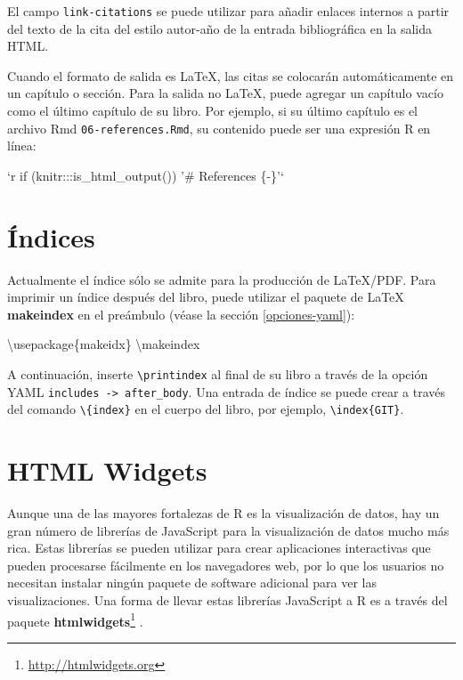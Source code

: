 \documentclass[12pt,]{krantz}
\makeatletter
\newenvironment{Shaded}{\begin{snugshade}}{\end{snugshade}}
\newcommand{\BaseNTok}[1]{\textcolor[rgb]{0.00,0.00,0.81}{#1}}
\newcommand{\FunctionTok}[1]{\textcolor[rgb]{0.00,0.00,0.00}{#1}}
\newcommand{\BuiltInTok}[1]{#1}
\newcommand{\ExtensionTok}[1]{#1}
\newcommand{\NormalTok}[1]{#1}
\renewcommand{\href}[2]{#2\footnote{\url{#1}}}
\newenvironment{kframe}{%
\medskip{}
\setlength{\fboxsep}{.8em}
 \def\at@end@of@kframe{}%
 \ifinner\ifhmode%
  \def\at@end@of@kframe{\end{minipage}}%
  \begin{minipage}{\columnwidth}%
 \fi\fi%
 \def\FrameCommand##1{\hskip\@totalleftmargin \hskip-\fboxsep
 \colorbox{shadecolor}{##1}\hskip-\fboxsep
     \hskip-\linewidth \hskip-\@totalleftmargin \hskip\columnwidth}%
 \MakeFramed {\advance\hsize-\width
   \@totalleftmargin\z@ \linewidth\hsize
   \@setminipage}}%
 {\par\unskip\endMakeFramed%
 \at@end@of@kframe}
\renewenvironment{Shaded}{\begin{kframe}}{\end{kframe}}
\theoremstyle{definition}
\theoremstyle{definition}
\theoremstyle{definition}
\theoremstyle{remark}
\makeatother
\begin{document}
El campo \texttt{link-citations} se puede utilizar para añadir enlaces
internos a partir del texto de la cita del estilo autor-año de la
entrada bibliográfica en la salida HTML.

Cuando el formato de salida es LaTeX, las citas se colocarán
automáticamente en un capítulo o sección. Para la salida no LaTeX, puede
agregar un capítulo vacío como el último capítulo de su libro. Por
ejemplo, si su último capítulo es el archivo Rmd
\texttt{06-references.Rmd}, su contenido puede ser una expresión R en
línea:

\begin{Shaded}
\begin{Highlighting}[]
\BaseNTok{`r if (knitr:::is_html_output()) '# References \{-\}'`}
\end{Highlighting}
\end{Shaded}

\section{Índices}\label{latex-index}

Actualmente el índice  sólo se admite para la producción de
LaTeX/PDF. Para imprimir un índice después del libro, puede utilizar el
paquete de LaTeX \textbf{makeindex} en el preámbulo (véase la sección
\ref{opciones-yaml}):

\begin{Shaded}
\begin{Highlighting}[]
\BuiltInTok{\textbackslash{}usepackage}\NormalTok{\{}\ExtensionTok{makeidx}\NormalTok{\}}
\FunctionTok{\textbackslash{}makeindex}
\end{Highlighting}
\end{Shaded}

A continuación, inserte \texttt{\textbackslash{}printindex} al final de
su libro a través de la opción YAML
\texttt{includes\ -\textgreater{}\ after\_body}. Una entrada de índice
se puede crear a través del comando \texttt{\textbackslash{}\{index\}}
en el cuerpo del libro, por ejemplo,
\texttt{\textbackslash{}index\{GIT\}}.

\section{HTML Widgets}\label{html-widgets}

Aunque una de las mayores fortalezas de R es la visualización de datos,
hay un gran número de librerías de JavaScript para la visualización de
datos mucho más rica. Estas librerías se pueden utilizar para crear
aplicaciones interactivas que pueden procesarse fácilmente en los
navegadores web, por lo que los usuarios no necesitan instalar ningún
paquete de software adicional para ver las visualizaciones. Una forma de
llevar estas librerías JavaScript a R es a través del paquete
\href{http://htmlwidgets.org}{\textbf{htmlwidgets}}
\citep{R-htmlwidgets}.
\end{document}

